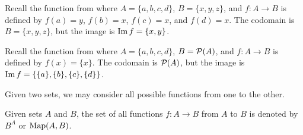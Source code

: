 \begin{example}
	Recall the function from  where $A = \{a, b, c, d\}$, $B = \{x, y, z\}$, and $f:A\rightarrow B$ is defined by $f(a) = y$, $f(b) = x$, $f(c) = x$, and $f(d) = x$. 
	The codomain is $B = \{x, y, z\}$, but the image is $\operatorname{Im} f = \{x, y\}$.
\end{example}

\begin{example}
	Recall the function from  where $A = \{a, b, c, d\}$, $B = \mathcal{P}(A)$, and $f:A\rightarrow B$ is defined by $f(x) = \{x\}$. 
	The codomain is $\mathcal{P}(A)$, but the image is $\operatorname{Im} f = \{\{a\}, \{b\}, \{c\}, \{d\}\}$.
\end{example}

Given two sets, we may consider all possible functions from one to the other.

\begin{definition}
	Given sets $A$ and $B$, the set of all functions $f:A\rightarrow B$ from $A$ to $B$ is denoted by $B^{A}$ or $\operatorname{Map}(A, B)$.
\end{definition}

